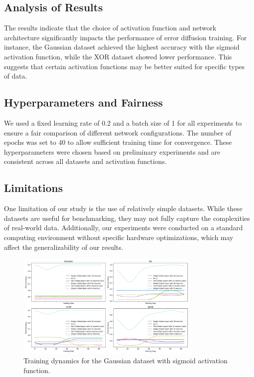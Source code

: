 \documentclass{article} %
\begin{document}
\subsection{Analysis of Results}
The results indicate that the choice of activation function and network architecture significantly impacts the performance of error diffusion training. For instance, the Gaussian dataset achieved the highest accuracy with the sigmoid activation function, while the XOR dataset showed lower performance. This suggests that certain activation functions may be better suited for specific types of data.

\subsection{Hyperparameters and Fairness}
We used a fixed learning rate of 0.2 and a batch size of 1 for all experiments to ensure a fair comparison of different network configurations. The number of epochs was set to 40 to allow sufficient training time for convergence. These hyperparameters were chosen based on preliminary experiments and are consistent across all datasets and activation functions.

\subsection{Limitations}
One limitation of our study is the use of relatively simple datasets. While these datasets are useful for benchmarking, they may not fully capture the complexities of real-world data. Additionally, our experiments were conducted on a standard computing environment without specific hardware optimizations, which may affect the generalizability of our results.

\begin{figure}[h]
    \centering
    \includegraphics[width=0.8\textwidth]{train_acc.png}
    \caption{Training dynamics for the Gaussian dataset with sigmoid activation function.}
    \label{fig:gaussian_sigmoid}
\end{figure}
\end{document}
